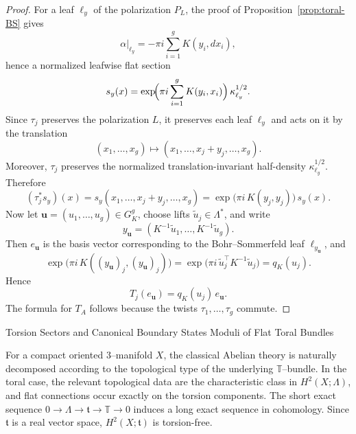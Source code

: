 \documentclass[12pt]{amsart}
\makeatletter
\renewcommand\section{\@startsection{section}{1}%
  \z@{.7\linespacing\@plus\linespacing}{.5\linespacing}%
  {\normalfont\bfseries\centering}}
\renewcommand\subsection{\@startsection{subsection}{2}%
  \z@{.5\linespacing\@plus.7\linespacing}{-.5em}%
  {\normalfont\bfseries}}
\numberwithin{equation}{section}
\makeatother
\begin{document}
\begin{proof}
For a leaf $\ell_y$ of the polarization $P_L$, the proof of Proposition~\ref{prop:toral-BS}
gives
\[
\alpha|_{\ell_y}
=
-\pi i\sum_{i=1}^g K(y_i,dx_i),
\]
hence a normalized leafwise flat section
\[
s_y(x)
=
\exp\!\Bigl(\pi i\sum_{i=1}^g K(y_i,x_i)\Bigr)\,\kappa_{\ell_y}^{1/2}.
\]
Since $\tau_j$ preserves the polarization $L$, it preserves each leaf $\ell_y$ and acts on
it by the translation
\[
(x_1,\dots,x_g)\longmapsto (x_1,\dots,x_j+y_j,\dots,x_g).
\]
Moreover, $\tau_j$ preserves the normalized translation-invariant half-density
$\kappa_{\ell_y}^{1/2}$. Therefore
\[
(\tau_j^*s_y)(x)
=
s_y(x_1,\dots,x_j+y_j,\dots,x_g)
=
\exp\!\bigl(\pi i\,K(y_j,y_j)\bigr)\,s_y(x).
\]
Now let $\mathbf u=(u_1,\dots,u_g)\in G_K^g$, choose lifts $\tilde u_j\in \Lambda^*$, and
write
\[
y_{\mathbf u}=(K^{-1}\tilde u_1,\dots,K^{-1}\tilde u_g).
\]
Then $e_{\mathbf u}$ is the basis vector corresponding to the Bohr--Sommerfeld leaf
$\ell_{y_{\mathbf u}}$, and
\[
\exp\!\bigl(\pi i\,K((y_{\mathbf u})_j,(y_{\mathbf u})_j)\bigr)
=
\exp\!\bigl(\pi i\,\tilde u_j^{\top}K^{-1}\tilde u_j\bigr)
=
q_K(u_j).
\]
Hence
\[
T_j(e_{\mathbf u})=q_K(u_j)\,e_{\mathbf u}.
\]
The formula for $T_A$ follows because the twists $\tau_1,\dots,\tau_g$ commute.
\end{proof}


\section{Torsion Sectors and Canonical Boundary States}
\subsection{Moduli of Flat Toral Bundles}

For a compact oriented \(3\)--manifold \(X\), the classical Abelian theory is
naturally decomposed according to the topological type of the underlying \(\mathbb T\)--bundle. In the toral case, the relevant topological data are the
characteristic class in \(H^2(X;\Lambda)\), and flat connections occur exactly on the torsion components. The short exact sequence $0\longrightarrow \Lambda\longrightarrow \mathfrak t\longrightarrow \mathbb T\longrightarrow 0$ induces a long exact sequence in cohomology. Since $\mathfrak t$ is a real
vector space, $H^2(X;\mathfrak t)$ is torsion-free.
\end{document}
